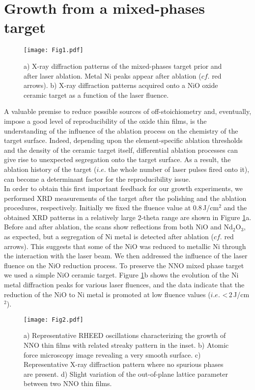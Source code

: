 \documentclass[aip,graphicx,numerical]{revtex4-1}
\begin{document}
\section{Growth from a mixed-phases target}
\begin{figure}
  \texttt{[image: Fig1.pdf]}
  \caption{a) X-ray diffraction patterns of the mixed-phases target prior and after laser ablation. Metal Ni peaks appear after ablation ($cf.$ red arrows). b) X-ray diffraction patterns acquired onto a NiO oxide ceramic target as a function of the laser fluence. }
  \label{fig1}
\end{figure}
A valuable premise to reduce possible sources of off-stoichiometry \cite{Dam_1998} and, eventually, impose a good level of reproducibility of the oxide thin films, is the understanding of the influence of the ablation process on the chemistry of the target surface. Indeed, depending upon the element-specific ablation thresholds and the density of the ceramic target itself, differential ablation processes can give rise to unexpected segregation onto the target surface. As a result, the ablation history of the target ($i.e.$ the whole number of laser pulses fired onto it), can become a determinant factor for the reproducibility issue.\\  
In order to obtain this first important feedback for our growth experiments, we performed XRD measurements of the target after the polishing and the ablation procedures, respectively. Initially we fixed the fluence value at 0.8\,J/cm$^{2}$ and the obtained XRD patterns in a relatively large 2-theta range are shown in Figure \ref{fig1}a. Before and after ablation, the scans show reflections from both NiO and Nd$_2$O$_3$, as expected, but a segregation of Ni metal is detected after ablation ($cf.$ red arrows). This suggests that some of the NiO was reduced to metallic Ni through the interaction with the laser beam. We then addressed the influence of the laser fluence on the NiO reduction process. To preserve the NNO mixed phase target we used a simple NiO ceramic target. Figure \ref{fig1}b shows the evolution of the Ni metal diffraction peaks for various laser fluences, and the data indicate that the reduction of the NiO to Ni metal is promoted at low fluence values ($i.e.$ <\,2\,J/cm$^2$). 
\begin{figure}
  \texttt{[image: Fig2.pdf]}
  \caption{a) Representative RHEED oscillations characterizing the growth of NNO thin films with related streaky pattern in the inset. b) Atomic force microscopy image revealing a very smooth surface. c) Representative X-ray diffraction pattern where no spurious phases are present. d) Slight variation of the out-of-plane lattice parameter between two NNO thin films.}
  \label{fig2}
\end{figure}
\end{document}

